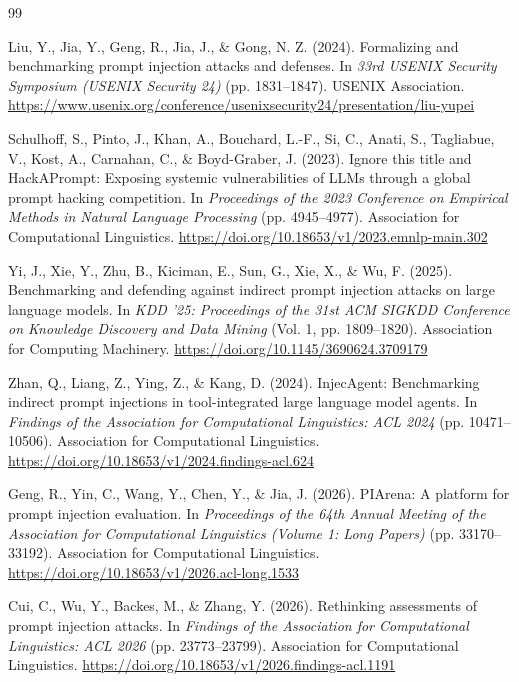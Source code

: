 \documentclass{BVP_AISC}
\begin{document}
\begin{thebibliography}{99}

 Liu, Y., Jia, Y., Geng, R., Jia, J., \& Gong, N. Z. (2024). Formalizing and benchmarking prompt injection attacks and defenses. In \textit{33rd USENIX Security Symposium (USENIX Security 24)} (pp. 1831--1847). USENIX Association. \url{https://www.usenix.org/conference/usenixsecurity24/presentation/liu-yupei}

 Schulhoff, S., Pinto, J., Khan, A., Bouchard, L.-F., Si, C., Anati, S., Tagliabue, V., Kost, A., Carnahan, C., \& Boyd-Graber, J. (2023). Ignore this title and HackAPrompt: Exposing systemic vulnerabilities of LLMs through a global prompt hacking competition. In \textit{Proceedings of the 2023 Conference on Empirical Methods in Natural Language Processing} (pp. 4945--4977). Association for Computational Linguistics. \url{https://doi.org/10.18653/v1/2023.emnlp-main.302}

 Yi, J., Xie, Y., Zhu, B., Kiciman, E., Sun, G., Xie, X., \& Wu, F. (2025). Benchmarking and defending against indirect prompt injection attacks on large language models. In \textit{KDD '25: Proceedings of the 31st ACM SIGKDD Conference on Knowledge Discovery and Data Mining} (Vol. 1, pp. 1809--1820). Association for Computing Machinery. \url{https://doi.org/10.1145/3690624.3709179}

 Zhan, Q., Liang, Z., Ying, Z., \& Kang, D. (2024). InjecAgent: Benchmarking indirect prompt injections in tool-integrated large language model agents. In \textit{Findings of the Association for Computational Linguistics: ACL 2024} (pp. 10471--10506). Association for Computational Linguistics. \url{https://doi.org/10.18653/v1/2024.findings-acl.624}

 Geng, R., Yin, C., Wang, Y., Chen, Y., \& Jia, J. (2026). PIArena: A platform for prompt injection evaluation. In \textit{Proceedings of the 64th Annual Meeting of the Association for Computational Linguistics (Volume 1: Long Papers)} (pp. 33170--33192). Association for Computational Linguistics. \url{https://doi.org/10.18653/v1/2026.acl-long.1533}

 Cui, C., Wu, Y., Backes, M., \& Zhang, Y. (2026). Rethinking assessments of prompt injection attacks. In \textit{Findings of the Association for Computational Linguistics: ACL 2026} (pp. 23773--23799). Association for Computational Linguistics. \url{https://doi.org/10.18653/v1/2026.findings-acl.1191}


\end{thebibliography}
\end{document}
